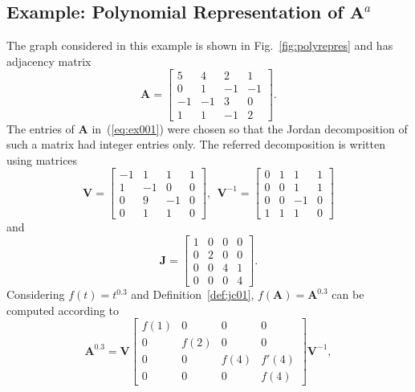 \subsection{Example: Polynomial Representation of $\mathbf{A}^{a}$}\label{subsec:num1}
The graph considered in this example is shown in Fig.~\ref{fig:polyrepres} and has adjacency matrix
\begin{equation}\label{eq:ex001}
\mathbf{A}=\left[\begin{array}{ccccc}
5 & 4 & 2 & 1 \\
0 & 1 & -1 & -1\\
-1 & -1 & 3 & 0\\
1 & 1 & -1 & 2
\end{array}\right].
\end{equation}
The entries of $\mathbf{A}$ in~(\ref{eq:ex001}) were chosen so that the Jordan decomposition of such a matrix had integer entries only. The referred decomposition is written using matrices
\begin{equation}\nonumber
\mathbf{V}=\left[\begin{array}{ccccc}
-1 & 1&1&1\\
1&-1&0&0\\
0&9&-1&0\\
0&1&1&0
\end{array}\right],\:\:
\mathbf{V}^{-1}=\left[\begin{array}{ccccc}
0&1&1&1\\
0&0&1&1\\
0&0&-1&0\\
1&1&1&0
\end{array}\right]
\end{equation}
and
\begin{equation}
\mathbf{J}=\left[\begin{array}{ccccc}
1&0&0&0\\
0&2&0&0\\
0&0&4&1\\
0&0&0&4
\end{array}\right].
\end{equation}
Considering $f(t)=t^{0.3}$ and Definition~\ref{def:jc01}, $f(\mathbf{A})=\mathbf{A}^{0.3}$ can be computed according to
\begin{equation}\nonumber
\mathbf{A}^{0.3}=\mathbf{V}
\left[\begin{array}{ccccc}
f(1)&0&0&0\\
0&f(2)&0&0\\
0&0&f(4)&f'(4)\\
0&0&0&f(4)
\end{array}\right]\mathbf{V}^{-1},
\end{equation}
